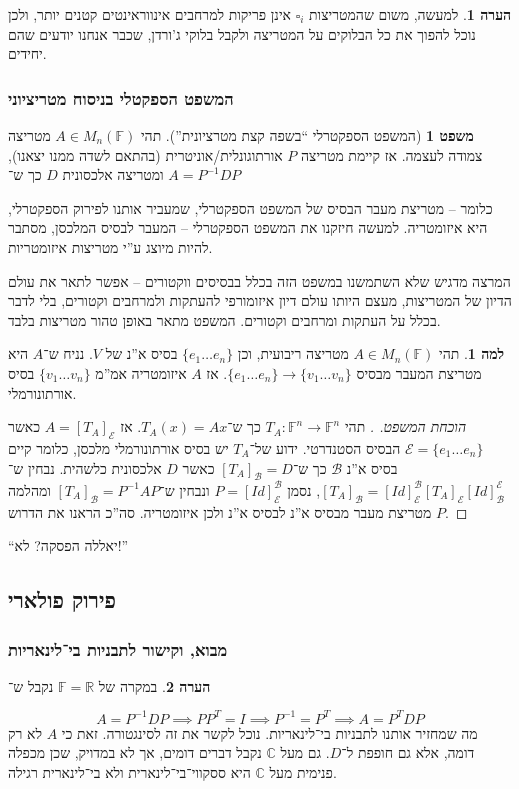 \documentclass[a4paper]{article}
\newcommand\R     {\mathbb{R}}
\newcommand\C     {\mathbb{C}}
\newcommand\bc    {\mathcal{B}}
\newcommand\ec    {\mathcal{E}}
\newcommand\F         {\mathbb{F}}
\newcommand\co        {\colon}
\newcommand\op    {^{-1}}
\theoremstyle{definition}
\newtheorem{Theorem}{\color{myblue}משפט}
\newtheorem{Lemma}{\color{myyellow}למה}
\newtheorem{Remark}{\color{mycyan}הערה}
\newcommand\rmark [1] {\begin{Remark}#1\end{Remark}}
\newcommand\lem   [1] {\begin{Lemma}#1\end{Lemma}}
\begin{document}
	\rmark{למעשה, משום שהמטריצות $\square_i$ אינן פריקות למרחבים אינווראינטים קטנים יותר, ולכן נוכל להפוך את כל הבלוקים על המטריצה ולקבל בלוקי ג'ורדן, שכבר אנחנו יודעים שהם יחידים. }
	
	\subsubsection{המשפט הספקטלי בניסוח מטריציוני}
	\begin{Theorem}[המשפט הספקטרלי ``בשפה קצת מטרציונית'']
		תהי $A \in M_n(\F)$ מטריצה צמודה לעצמה. אז קיימת  מטריצה $P$ אורתוגונלית/אוניטרית (בהתאם לשדה ממנו יצאנו), ומטריצה אלכסונית $D$ כך ש־
		$ A = P\op D P $
	\end{Theorem}
	כלומר – מטריצת מעבר הבסיס של המשפט הספקטרלי, שמעביר אותנו לפירוק הספקטרלי, היא איזומטריה. למעשה חיזקנו את המשפט הספקטרלי – המעבר לבסיס המלכסן, מסתבר להיות מיוצג ע''י מטריצות איזומטריות. 
	
	המרצה מדגיש שלא השתמשנו במשפט הזה בכלל בבסיסים ווקטורים – אפשר לתאר את עולם הדיון של המטריצות, מעצם היותו עולם דיון איזומורפי להעתקות ולמרחבים וקטורים, בלי לדבר בכלל על העתקות ומרחבים וקטורים. המשפט מתאר באופן טהור מטריצות בלבד. 
	
	\lem{תהי $A \in M_n(\F)$ מטריצה ריבועית, וכן $\{e_1 \dots e_n\}$ בסיס א''נ של $V$. נניח ש־$A$ היא מטריצת המעבר מבסיס $\{e_1 \dots e_n\} \to \{v_1 \dots v_n\}$. אז $A$ איזומטריה אמ''מ $\{v_1 \dots v_n\}$ בסיס אורתונורמלי. }
	\begin{proof}[הוכחת המשפט. ]
		תהי $T_A \co \F^n \to \F^n$ כך ש־$T_A(x) = Ax$. אז $A= [T_A]_\ec$ כאשר $\ec = \{e_1 \dots e_n\}$ הבסיס הסטנדרטי. ידוע של־$T_A$ יש בסיס אורתונורמלי מלכסן, כלומר קיים בסיס א''נ $\bc$ כך ש־$[T_A]_\bc = D$ כאשר $D$ אלכסונית כלשהית. נבחין ש־$[T_A]_\bc = [Id]^\bc_\ec [T_A]_\ec [Id]_\bc^\ec$, נסמן $P = [Id]^\bc_\ec$ ונבחין ש־$[T_A]_\bc = P\op AP$ ומהלמה $P$ מטריצת מעבר מבסיס א''נ לבסיס א''נ ולכן איזומטריה. סה''כ הראנו את הדרוש. 
	\end{proof}
	
	``יאללה הפסקה? לא!''
	
	\subsection{פירוק פולארי}
	\subsubsection{מבוא, וקישור לתבניות בי־לינאריות}
	\rmark{במקרה של $\F= \R$ נקבל ש־}
	\[ A = P\op DP \implies PP^T = I \implies P\op = P^T \implies A = P^TDP \]
	מה שמחזיר אותנו לתבניות בי־לינאריות. נוכל לקשר את זה לסינגטורה. זאת כי $A$ לא רק דומה, אלא גם חופפת ל־$D$. גם מעל $\C$ נקבל דברים דומים, אך לא במדויק, שכן מכפלה פנימית מעל $\C$ היא ססקווי־בי־לינארית ולא בי־לינארית רגילה. 
	
\end{document}
